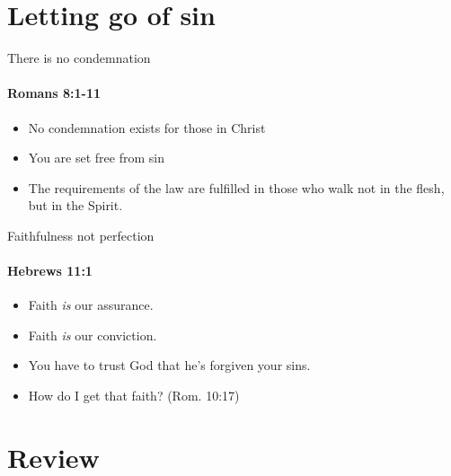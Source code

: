 \section{Letting go of sin}

\begin{frame}{There is no condemnation}
\framesubtitle{Romans 8:1-11}
\begin{itemize}
\item No condemnation exists for those in Christ
\item You are set free from sin
\item The requirements of the law are fulfilled in those who walk not in the flesh, but in the Spirit.
\end{itemize}

\end{frame}

\begin{frame}{Faithfulness not perfection}
\framesubtitle{Hebrews 11:1}

\begin{itemize}
\item Faith \emph{is} our assurance.
\item Faith \emph{is} our conviction.
\item You have to trust God that he's forgiven your sins.
\item How do I get that faith? (Rom. 10:17)
\end{itemize}

\end{frame}

\section{Review}

